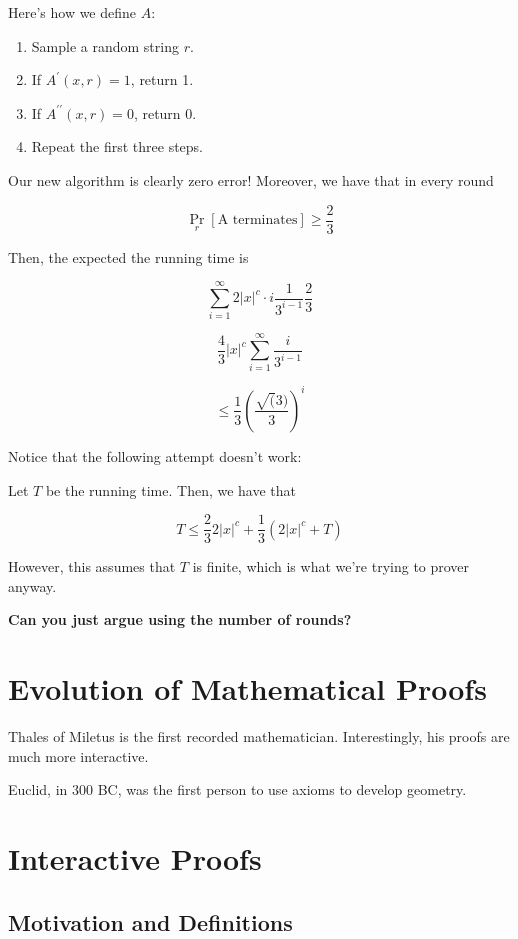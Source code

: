 \documentclass{article}
\theoremstyle{definition}
\newcommand{\xtoc}{\lvert x \rvert ^{c}}
\newcommand{\dprime}{\prime\prime}
\begin{document}
Here's how we define $A$:

\begin{enumerate}
    \item Sample a random string $r$.
    \item If $A^{\prime}(x,r) = 1$, return 1.
    \item If $A^{\dprime}(x,r) = 0$, return 0.
    \item Repeat the first three steps.
\end{enumerate}

Our new algorithm is clearly zero error! Moreover, we have that
in every round

\[ \Pr_{r}[\text{A terminates}] \geq \frac{2}{3} \]

Then, the expected the running time is

\[ \sum_{i = 1}^{\infty} 2 \xtoc \cdot i \frac{1}{3^{i-1}} \frac{2}{3} \]

\[ \frac{4}{3} \xtoc \sum_{i = 1}^{\infty} \frac{i}{3^{i-1}} \]

\[ \leq \frac{1}{3} (\frac{\sqrt(3)}{3})^{i} \]

Notice that the following attempt doesn't work:

Let $T$ be the running time. Then, we have that

\[ T \leq \frac{2}{3} 2 \xtoc + \frac{1}{3}(2 \xtoc + T)\]

However, this assumes that $T$ is finite, which is what we're
trying to prover anyway.

\textbf{Can you just argue using the number of rounds?}

\newpage

\section{Evolution of Mathematical Proofs}

Thales of Miletus is the first recorded mathematician. Interestingly,
his proofs are much more interactive.


Euclid, in 300 BC, was the first person to use axioms to develop geometry.

\newpage

\section{Interactive Proofs}

\subsection{Motivation and Definitions}
\end{document}
